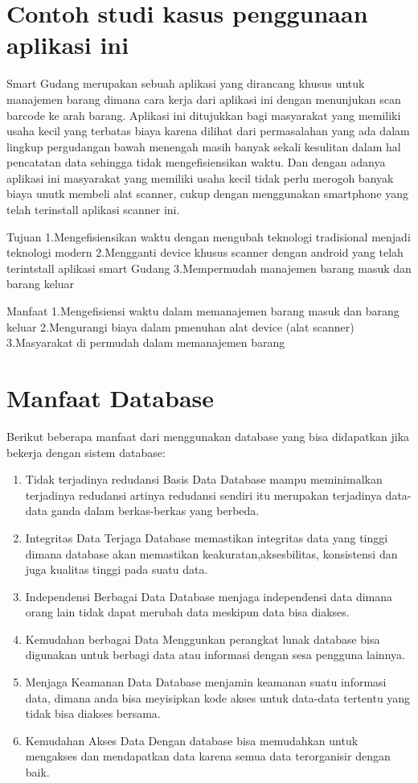 \section{Contoh studi kasus penggunaan aplikasi ini}
Smart Gudang merupakan sebuah aplikasi yang dirancang khusus untuk manajemen barang dimana cara kerja dari aplikasi ini dengan menunjukan scan barcode ke arah barang. Aplikasi ini ditujukkan bagi masyarakat yang memiliki usaha kecil yang terbatas biaya karena dilihat dari permasalahan yang ada dalam lingkup pergudangan bawah menengah masih banyak sekali kesulitan dalam hal pencatatan data sehingga tidak mengefisiensikan waktu. Dan dengan adanya aplikasi ini masyarakat yang memiliki usaha kecil tidak perlu merogoh banyak biaya unutk membeli alat scanner, cukup dengan menggunakan smartphone yang telah terinstall aplikasi scanner ini.

Tujuan
1.Mengefisiensikan waktu dengan mengubah teknologi tradisional menjadi teknologi modern
2.Mengganti device khusus scanner dengan android yang telah terintstall aplikasi smart Gudang
3.Mempermudah manajemen barang masuk dan barang keluar 

Manfaat
1.Mengefisiensi waktu dalam memanajemen barang masuk dan barang keluar 
2.Mengurangi biaya dalam pmenuhan alat device (alat scanner)
3.Masyarakat di permudah dalam memanajemen barang

\section{Manfaat Database}
Berikut beberapa manfaat dari menggunakan database yang bisa didapatkan jika bekerja dengan sistem database:
\begin{enumerate}
\item Tidak terjadinya redudansi Basis Data
\hfill \break
Database mampu meminimalkan terjadinya redudansi artinya redudansi sendiri itu merupakan terjadinya data-data ganda dalam berkas-berkas yang berbeda. 
\item Integritas Data Terjaga
\hfill \break
Database memastikan integritas data yang tinggi dimana database akan memastikan keakuratan,aksesbilitas, konsistensi dan juga kualitas tinggi pada suatu data.
\item Independensi Berbagai Data
\hfill \break
Database menjaga independensi data dimana orang lain tidak dapat merubah data meskipun data bisa diakses.
\item Kemudahan berbagai Data
\hfill \break
Menggunkan perangkat lunak database bisa digunakan untuk berbagi data atau informasi dengan sesa pengguna lainnya.
\item Menjaga Keamanan Data
Database menjamin keamanan suatu informasi data, dimana anda bisa meyisipkan kode akses untuk data-data tertentu yang tidak bisa diakses bersama.
\item Kemudahan Akses Data
\hfill \break
Dengan database bisa memudahkan untuk mengakses dan mendapatkan data karena semua data terorganisir dengan baik.
\end{enumerate}

